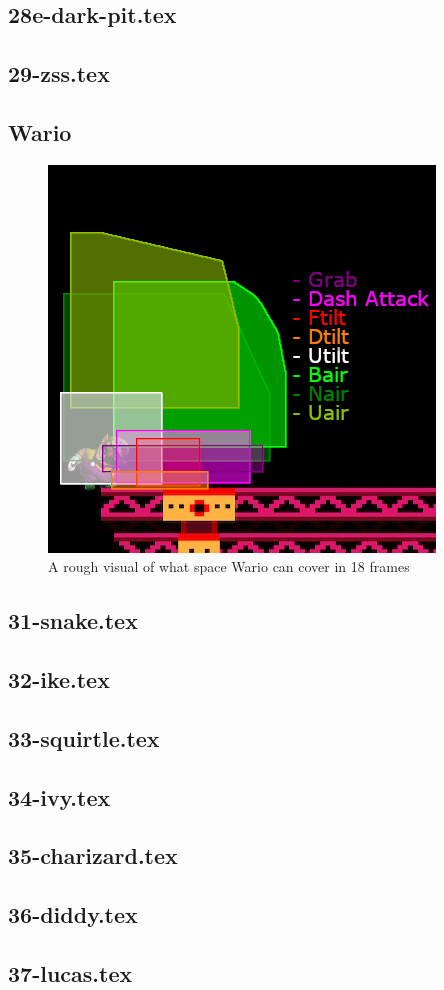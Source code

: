 \subsection{28e-dark-pit.tex}
\subsection{29-zss.tex}

\subsection{Wario}
\begin{figure}[h]
    \centering
    \includegraphics[width=.4\textwidth]{images/threat-ranges/wario}
    \caption{A rough visual of what space Wario can cover in 18 frames\cite{ref:threat-range:wario}}
\end{figure}
\subsection{31-snake.tex}
\subsection{32-ike.tex}
\subsection{33-squirtle.tex}
\subsection{34-ivy.tex}
\subsection{35-charizard.tex}
\subsection{36-diddy.tex}
\subsection{37-lucas.tex}
